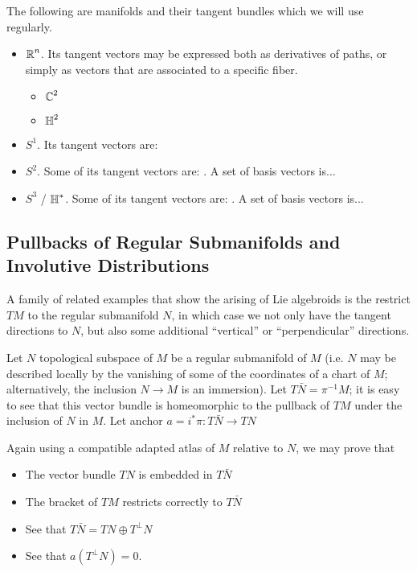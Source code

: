 The following are manifolds and their tangent bundles which we will use regularly.

    \begin{itemize}
    \item $\operatorname{\mathbb{R}}^n$. Its tangent vectors may be expressed both as derivatives of paths, or simply as vectors that are associated to a specific fiber.
        \begin{itemize}
        \item $\operatorname{\mathbb{C}}^2$
        \item $\operatorname{\mathbb{H}}^2$
        \end{itemize}
    \item $S^1$. Its tangent vectors are:
    \item $S^2$. Some of its tangent vectors are: . A set of basis vectors is...
    \item $S^3$ / $\operatorname{\mathbb{H}}^*$. Some of its tangent vectors are: . A set of basis vectors is...
    \end{itemize}


\subsection{Pullbacks of Regular Submanifolds and Involutive Distributions}

A family of related examples that show the arising of Lie algebroids is the restrict $TM$ to the regular submanifold $N$, in which case we not only have the tangent directions to $N$, but also some additional ``vertical'' or ``perpendicular'' directions.

Let $N$ topological subspace of $M$ be a regular submanifold of $M$ (i.e. $N$ may be described locally by the vanishing of some of the coordinates of a chart of $M$; alternatively, the inclusion $N \to M$ is an immersion). Let $T\bar N = \pi^{-1} M$; it is easy to see that this vector bundle is homeomorphic to the pullback of $TM$ under the inclusion of $N$ in $M$. Let anchor $a = i^*\pi: T \bar N \to TN$ 

Again using a compatible adapted atlas of $M$ relative to $N$, we may prove that 
\begin{itemize}
\item The vector bundle $TN$ is embedded in $T \bar N$
\item The bracket of $TM$ restricts correctly to $T \bar N$
\item See that $T \bar N = TN \oplus T^\perp N$
\item See that $a(T^\perp N) = 0$.
\end{itemize}
 
